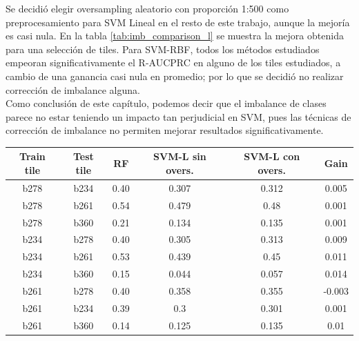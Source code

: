 Se decidió elegir oversampling aleatorio con proporción 1:500 como preprocesamiento para SVM Lineal en el resto de este trabajo, aunque la mejoría es casi nula. En la tabla \ref{tab:imb_comparison_l} se muestra la mejora obtenida para una selección de tiles. Para SVM-RBF, todos los métodos estudiados empeoran significativamente el R-AUCPRC en alguno de los tiles estudiados, a cambio de una ganancia casi nula en promedio; por lo que se decidió no realizar corrección de imbalance alguna. \\

Como conclusión de este capítulo, podemos decir que el imbalance de clases parece no estar teniendo un impacto tan perjudicial en SVM, pues las técnicas de corrección de imbalance no permiten mejorar resultados significativamente.

\begin{table}[ht]
\centering
\begin{tabular}{|c|c|c|c|c|c|}
\hline
\textbf{Train tile} & \textbf{Test tile} & \textbf{RF} & \textbf{SVM-L sin overs.} & \textbf{SVM-L con overs.} & \textbf{Gain} \\ \hline
b278                & b234               & 0.40        & 0.307                     & 0.312                     & 0.005         \\ \hline
b278                & b261               & 0.54        & 0.479                     & 0.48                      & 0.001         \\ \hline
b278                & b360               & 0.21        & 0.134                     & 0.135                     & 0.001         \\ \hline
b234                & b278               & 0.40        & 0.305                     & 0.313                     & 0.009         \\ \hline
b234                & b261               & 0.53        & 0.439                     & 0.45                      & 0.011         \\ \hline
b234                & b360               & 0.15        & 0.044                     & 0.057                     & 0.014         \\ \hline
b261                & b278               & 0.40        & 0.358                     & 0.355                     & -0.003        \\ \hline
b261                & b234               & 0.39        & 0.3                       & 0.301                     & 0.001         \\ \hline
b261                & b360               & 0.14        & 0.125                     & 0.135                     & 0.01          \\ \hline

\end{tabular}
\end{table}
